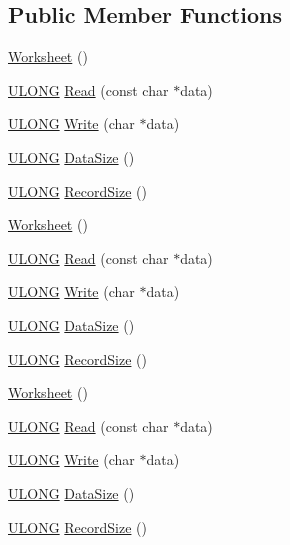 \subsection*{Public Member Functions}
\begin{DoxyCompactItemize}
\item 
\hyperlink{class_y_excel_1_1_worksheet_aebc423f7858e7f98422a82858a48e354}{Worksheet} ()
\item 
\hyperlink{_basic_excel_8hpp_abe09d1bea023be6a07cbadde8e955435}{U\+L\+O\+N\+G} \hyperlink{class_y_excel_1_1_worksheet_a70d32467ecd0f5a2d6c212a14f534787}{Read} (const char $\ast$data)
\item 
\hyperlink{_basic_excel_8hpp_abe09d1bea023be6a07cbadde8e955435}{U\+L\+O\+N\+G} \hyperlink{class_y_excel_1_1_worksheet_a22f78778551f6fbd8257d8096f36e3a7}{Write} (char $\ast$data)
\item 
\hyperlink{_basic_excel_8hpp_abe09d1bea023be6a07cbadde8e955435}{U\+L\+O\+N\+G} \hyperlink{class_y_excel_1_1_worksheet_a947210f2a52f61b2df007bbe2ce21f4a}{Data\+Size} ()
\item 
\hyperlink{_basic_excel_8hpp_abe09d1bea023be6a07cbadde8e955435}{U\+L\+O\+N\+G} \hyperlink{class_y_excel_1_1_worksheet_a4f59aea1762f9a80ba3928239a4238a6}{Record\+Size} ()
\item 
\hyperlink{class_y_excel_1_1_worksheet_aebc423f7858e7f98422a82858a48e354}{Worksheet} ()
\item 
\hyperlink{_basic_excel_8hpp_abe09d1bea023be6a07cbadde8e955435}{U\+L\+O\+N\+G} \hyperlink{class_y_excel_1_1_worksheet_a70d32467ecd0f5a2d6c212a14f534787}{Read} (const char $\ast$data)
\item 
\hyperlink{_basic_excel_8hpp_abe09d1bea023be6a07cbadde8e955435}{U\+L\+O\+N\+G} \hyperlink{class_y_excel_1_1_worksheet_a22f78778551f6fbd8257d8096f36e3a7}{Write} (char $\ast$data)
\item 
\hyperlink{_basic_excel_8hpp_abe09d1bea023be6a07cbadde8e955435}{U\+L\+O\+N\+G} \hyperlink{class_y_excel_1_1_worksheet_a947210f2a52f61b2df007bbe2ce21f4a}{Data\+Size} ()
\item 
\hyperlink{_basic_excel_8hpp_abe09d1bea023be6a07cbadde8e955435}{U\+L\+O\+N\+G} \hyperlink{class_y_excel_1_1_worksheet_a4f59aea1762f9a80ba3928239a4238a6}{Record\+Size} ()
\item 
\hyperlink{class_y_excel_1_1_worksheet_aebc423f7858e7f98422a82858a48e354}{Worksheet} ()
\item 
\hyperlink{_basic_excel_8hpp_abe09d1bea023be6a07cbadde8e955435}{U\+L\+O\+N\+G} \hyperlink{class_y_excel_1_1_worksheet_a70d32467ecd0f5a2d6c212a14f534787}{Read} (const char $\ast$data)
\item 
\hyperlink{_basic_excel_8hpp_abe09d1bea023be6a07cbadde8e955435}{U\+L\+O\+N\+G} \hyperlink{class_y_excel_1_1_worksheet_a22f78778551f6fbd8257d8096f36e3a7}{Write} (char $\ast$data)
\item 
\hyperlink{_basic_excel_8hpp_abe09d1bea023be6a07cbadde8e955435}{U\+L\+O\+N\+G} \hyperlink{class_y_excel_1_1_worksheet_a947210f2a52f61b2df007bbe2ce21f4a}{Data\+Size} ()
\item 
\hyperlink{_basic_excel_8hpp_abe09d1bea023be6a07cbadde8e955435}{U\+L\+O\+N\+G} \hyperlink{class_y_excel_1_1_worksheet_a4f59aea1762f9a80ba3928239a4238a6}{Record\+Size} ()
\end{DoxyCompactItemize}

